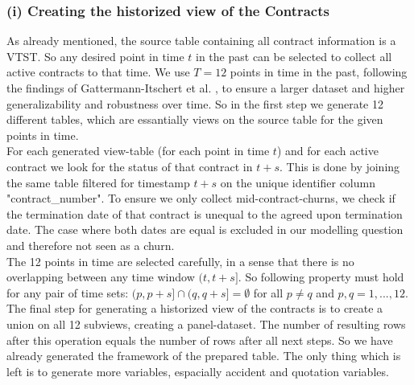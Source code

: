 \documentclass[12pt,titlepage]{article}
\begin{document}
\subsubsection*{(i) Creating the historized view of the Contracts}
As already mentioned, the source table containing all contract information is a VTST. So any desired point in time $t$ in the past can be selected to collect all active contracts to that time. We use $T=12$ points in time in the past, following the findings of Gattermann-Itschert et al. \cite{multiplets}, to ensure a larger dataset and higher generalizability and robustness over time. So in the first step we generate 12 different tables, which are essantially views on the source table for the given points in time.\\
For each generated view-table (for each point in time $t$) and for each active contract we look for the status of that contract in $t+s$. This is done by joining the same table filtered for timestamp $t+s$ on the unique identifier column "contract\_number". To ensure we only collect mid-contract-churns, we check if the termination date of that contract is unequal to the agreed upon termination date. The case where both dates are equal is excluded in our modelling question and therefore not seen as a churn. \\
The 12 points in time are selected carefully, in a sense that there is no overlapping between any time window $(t, t+s]$. So following property must hold for any pair of time sets: $(p, p+s] \cap (q, q+s] = \emptyset$ for all $p \neq q$ and $p,q=1,...,12$. \\
The final step for generating a historized view of the contracts is to create a union on all 12 subviews, creating a panel-dataset. The number of resulting rows after this operation equals the number of rows after all next steps. So we have already generated the framework of the prepared table. The only thing which is left is to generate more variables, espacially accident and quotation variables. \\
\end{document}
